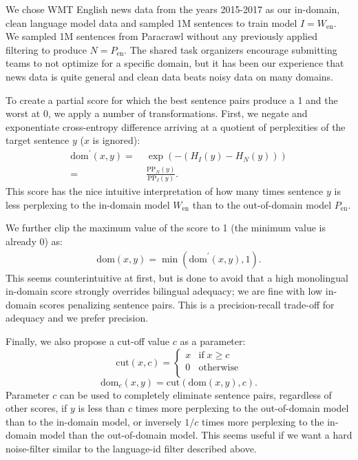 \documentclass[11pt,a4paper]{article}
\begin{document}
We chose WMT English news data from the years 2015-2017 as our in-domain, clean language model data and sampled 1M sentences to train model $I=W_{\mathrm{en}}$. We sampled 1M sentences from Paracrawl without any previously applied filtering to produce $N=P_{\mathrm{en}}$. The shared task organizers encourage submitting teams to not optimize for a specific domain, but it has been our experience that news data is quite general and clean data beats noisy data on many domains. 

To create a partial score for which the best sentence pairs produce a 1 and the worst at 0, we apply a number of transformations. First, we negate and exponentiate cross-entropy difference arriving at a quotient of perplexities of the target sentence $y$ ($x$ is ignored):
\begin{equation*}
\begin{aligned}
\mathrm{dom}^\prime(x,y) = & \; \exp(-(H_{I}(y) - H_{N}(y))) \\ = & \; \frac{\mathrm{PP}_{N}(y)}{\mathrm{PP}_{I}(y)}.
\end{aligned}
\end{equation*}
This score has the nice intuitive interpretation of how many times sentence $y$ is less perplexing to the in-domain model $W_{\mathrm{en}}$ than to the out-of-domain model $P_{\mathrm{en}}$. 

We further clip the maximum value of the score to 1 (the minimum value is already 0) as:
\begin{equation}
\begin{aligned}
\mathrm{dom}(x,y) = \min(\mathrm{dom}^\prime(x,y), 1).
\end{aligned}
\end{equation}
This seems counterintuitive at first, but is done to avoid that a high monolingual in-domain score strongly overrides bilingual adequacy; we are fine with low in-domain scores penalizing sentence pairs. This is a precision-recall trade-off for adequacy and we prefer precision.

Finally, we also propose a cut-off value $c$ as a parameter:
\begin{equation*}
\mathrm{cut}(x, c) = \left\{ \begin{array}{ll} x & \mathrm{if \;} x \geq c \\ 0 & \mathrm{otherwise} \\ \end{array} \right.
\end{equation*}
\begin{equation}
\mathrm{dom}_c(x,y) = \mathrm{cut}(\mathrm{dom}(x,y), c).
\end{equation}
Parameter $c$ can be used to completely eliminate sentence pairs, regardless of other scores, if $y$ is less than $c$ times more perplexing to the out-of-domain model than to the in-domain model, or inversely $1/c$ times more perplexing to the in-domain model than the out-of-domain model. This seems useful if we want a hard noise-filter similar to the language-id filter described above.
\end{document}

